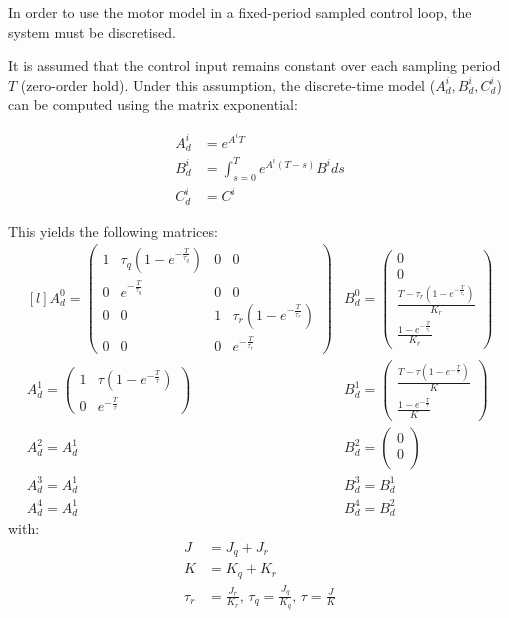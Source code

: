 \documentclass[english,12pt,a4paper]{article}
\begin{document}
	In order to use the motor model in a fixed-period sampled control loop, the system must be discretised.
	
	It is assumed that the control input remains constant over each sampling period $T$ (zero-order hold).
	Under this assumption, the discrete-time model ($A_d^i, B_d^i, C_d^i$) can be computed using the matrix exponential:
	
	\begin{align}
		A_d^i &= e^{A^iT} \\
		B_d^i &= \int_{s=0}^T e^{A^i(T-s)}B^ids \\
		C_d^i &= C^i
	\end{align}
	

	This yields the following matrices:
	\begin{equation}
		\begin{matrix*}[l]
			A_d^0 = \begin{pmatrix}
				1 & \tau_q(1-e^{-\frac{T}{\tau_q}}) & 0 & 0 \\
				0 & e^{-\frac{T}{\tau_q}} & 0 & 0 \\
				0 & 0 & 1 & \tau_r(1-e^{-\frac{T}{\tau_r}}) \\
				0 & 0 & 0 & e^{-\frac{T}{\tau_r}}
			\end{pmatrix}&
			B_d^0 = \begin{pmatrix}
				0 \\
				0 \\
				\frac{T - \tau_r (1 - e^{-\frac{T}{\tau_r}})}{K_r} \\
				\frac{1-e^{-\frac{T}{\tau_r}}}{K_r}
			\end{pmatrix} \\
			A_d^1 = \begin{pmatrix}
				1 & \tau(1-e^{-\frac{T}{\tau}}) \\
				0 & e^{-\frac{T}{\tau}}
			\end{pmatrix}&
			B_d^1 = \begin{pmatrix}
				\frac{T - \tau (1 - e^{-\frac{T}{\tau}})}{K} \\
				\frac{1-e^{-\frac{T}{\tau}}}{K}
			\end{pmatrix} \\
			A_d^2 = A_d^1&
			B_d^2 = \begin{pmatrix}
				0 \\
				0 \\
			\end{pmatrix} \\
			A_d^3 = A_d^1&
			B_d^3 = B_d^1 \\
			A_d^4 = A_d^1&
			B_d^4 = B_d^2
		\end{matrix*}
	\end{equation}
	with:
	\begin{align}
		J &= J_q+J_r \\
		K &= K_q+K_r \\
		\tau_r &= \frac{J_r}{K_r} \text{, }
		\tau_q = \frac{J_q}{K_q} \text{, }
		\tau = \frac{J}{K}
	\end{align}
\end{document}
